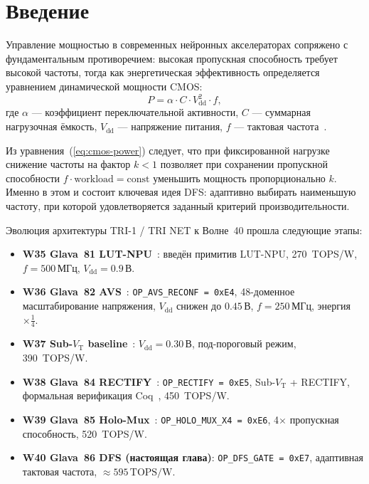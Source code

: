 \section{Введение}
\label{sec:glava86-intro}


Управление мощностью в современных нейронных акселераторах сопряжено
с фундаментальным противоречием: высокая пропускная способность требует
высокой частоты, тогда как энергетическая эффективность определяется
уравнением динамической мощности CMOS:
\begin{equation}
  P = \alpha \cdot C \cdot V_{\mathrm{dd}}^{2} \cdot f,
  \label{eq:cmos-power}
\end{equation}
где $\alpha$ — коэффициент переключательной активности, $C$ — суммарная
нагрузочная ёмкость, $V_{\mathrm{dd}}$ — напряжение питания, $f$ — тактовая
частота~\cite{Weste-Harris-CMOS4}.

Из уравнения~(\ref{eq:cmos-power}) следует, что при фиксированной нагрузке
снижение частоты на фактор $k < 1$ позволяет при сохранении пропускной
способности $f \cdot \text{workload} = \mathrm{const}$ уменьшить мощность
пропорционально $k$.  Именно в этом и состоит ключевая идея DFS: адаптивно
выбирать наименьшую частоту, при которой удовлетворяется заданный критерий
производительности.


Эволюция архитектуры TRI-1 / TRI NET к Волне~40 прошла следующие этапы:
\begin{itemize}
  \item \textbf{W35 Glava~81 LUT-NPU}~\cite{trios884}:
        введён примитив LUT-NPU, 270~TOPS/W, $f = 500\,\text{МГц}$,
        $V_{\mathrm{dd}} = 0{.}9\,\text{В}$.
  \item \textbf{W36 Glava~82 AVS}~\cite{trios877}:
        \texttt{OP\_AVS\_RECONF = 0xE4}, 48-доменное масштабирование напряжения,
        $V_{\mathrm{dd}}$ снижен до $0{.}45\,\text{В}$, $f = 250\,\text{МГц}$,
        энергия $\times\frac{1}{4}$.
  \item \textbf{W37 Sub-$V_{\mathrm{T}}$ baseline}~\cite{t27660}:
        $V_{\mathrm{dd}} = 0{.}30\,\text{В}$, под-пороговый режим, 390~TOPS/W.
  \item \textbf{W38 Glava~84 RECTIFY}~\cite{trios884}:
        \texttt{OP\_RECTIFY = 0xE5}, Sub-$V_{\mathrm{T}}$ + RECTIFY,
        формальная верификация Coq~\cite{t27661}, 450~TOPS/W.
  \item \textbf{W39 Glava~85 Holo-Mux}~\cite{trios891}:
        \texttt{OP\_HOLO\_MUX\_X4 = 0xE6}, 4$\times$ пропускная способность,
        520~TOPS/W.
  \item \textbf{W40 Glava~86 DFS (настоящая глава)}:
        \texttt{OP\_DFS\_GATE = 0xE7}, адаптивная тактовая частота,
        $\approx 595\,\text{TOPS/W}$.
\end{itemize}

